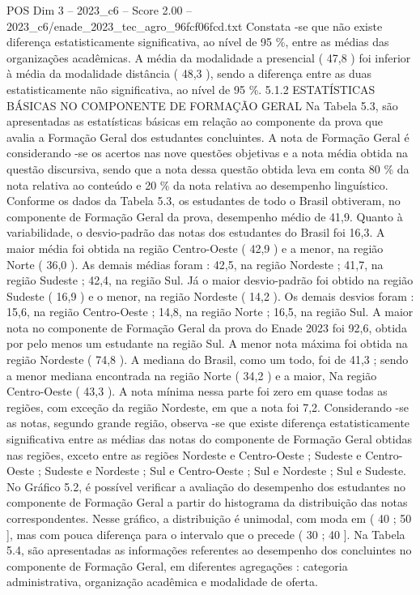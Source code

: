 \begin{textsample}{POS Dim 3 – 2023\_c6 – Score 2.00 – 2023\_c6/enade\_2023\_tec\_agro\_96fcf06fcd.txt}
Constata -se que não existe diferença estatisticamente significativa, ao nível de 95 \%, entre as médias das organizações acadêmicas.
A média da modalidade a presencial ( 47,8 ) foi inferior à média da modalidade distância ( 48,3 ), sendo a diferença entre as duas estatisticamente não significativa, ao nível de 95 \%. 5.1.2 ESTATÍSTICAS BÁSICAS NO COMPONENTE DE FORMAÇÃO GERAL Na Tabela 5.3, são apresentadas as estatísticas básicas em relação ao componente da prova que avalia a Formação Geral dos estudantes concluintes.
A nota de Formação Geral é considerando -se os acertos nas nove questões objetivas e a nota média obtida na questão discursiva, sendo que a nota dessa questão obtida leva em conta 80 \% da nota relativa ao conteúdo e 20 \% da nota relativa ao desempenho linguístico.
Conforme os dados da Tabela 5.3, os estudantes de todo o Brasil obtiveram, no componente de Formação Geral da prova, desempenho médio de 41,9.
Quanto à variabilidade, o desvio-padrão das notas dos estudantes do Brasil foi 16,3.
A maior média foi obtida na região Centro-Oeste ( 42,9 ) e a menor, na região Norte ( 36,0 ).
As demais médias foram : 42,5, na região Nordeste ; 41,7, na região Sudeste ; 42,4, na região Sul.
Já o maior desvio-padrão foi obtido na região Sudeste ( 16,9 ) e o menor, na região Nordeste ( 14,2 ).
Os demais desvios foram : 15,6, na região Centro-Oeste ; 14,8, na região Norte ; 16,5, na região Sul.
A maior nota no componente de Formação Geral da prova do Enade 2023 foi 92,6, obtida por pelo menos um estudante na região Sul.
A menor nota máxima foi obtida na região Nordeste ( 74,8 ).
A mediana do Brasil, como um todo, foi de 41,3 ; sendo a menor mediana encontrada na região Norte ( 34,2 ) e a maior, Na região Centro-Oeste ( 43,3 ).
A nota mínima nessa parte foi zero em quase todas as regiões, com exceção da região Nordeste, em que a nota foi 7,2.
Considerando -se as notas, segundo grande região, observa -se que existe diferença estatisticamente significativa entre as médias das notas do componente de Formação Geral obtidas nas regiões, exceto entre as regiões Nordeste e Centro-Oeste ; Sudeste e Centro-Oeste ; Sudeste e Nordeste ; Sul e Centro-Oeste ; Sul e Nordeste ; Sul e Sudeste.
No Gráfico 5.2, é possível verificar a avaliação do desempenho dos estudantes no componente de Formação Geral a partir do histograma da distribuição das notas correspondentes.
Nesse gráfico, a distribuição é unimodal, com moda em ( 40 ; 50 ], mas com pouca diferença para o intervalo que o precede ( 30 ; 40 ].
Na Tabela 5.4, são apresentadas as informações referentes ao desempenho dos concluintes no componente de Formação Geral, em diferentes agregações : categoria administrativa, organização acadêmica e modalidade de oferta.

\end{textsample}
